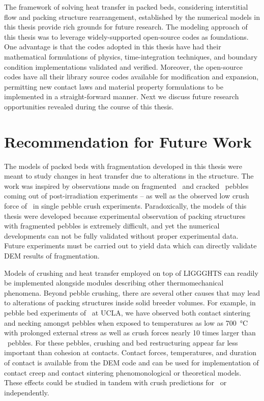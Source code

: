 The framework of solving heat transfer in packed beds, considering interstitial flow and packing structure rearrangement, established by the numerical models in this thesis provide rich grounds for future research. The modeling approach of this thesis was to leverage widely-supported open-source codes as foundations. One advantage is that the codes adopted in this thesis have had their mathematical formulations of physics, time-integration techniques, and boundary condition implementations validated and verified. Moreover, the open-source codes have all their library source codes available for modification and expansion, permitting new contact laws and material property formulations to be implemented in a straight-forward manner. Next we discuss future research opportunities revealed during the course of this thesis.

\section{Recommendation for Future Work}

The models of packed beds with fragmentation developed in this thesis were meant to study changes in heat transfer due to alterations in the structure. The work was inspired by observations made on fragmented \lis~and cracked \lit~pebbles coming out of post-irradiation experiments -- as well as the observed low crush force of \lis~in single pebble crush experiments. Paradoxically, the models of this thesis were developed because experimental observation of packing structures with fragmented pebbles is extremely difficult, and yet the numerical developments can not be fully validated without proper experimental data. Future experiments must be carried out to yield data which can directly validate DEM results of fragmentation.

Models of crushing and heat transfer employed on top of LIGGGHTS can readily be implemented alongside modules describing other thermomechanical phenomena. Beyond pebble crushing, there are several other causes that may lead to alterations of packing structures inside solid breeder volumes. For example, in pebble bed experiments of \lit~at UCLA, we have observed both contact sintering and necking amongst pebbles when exposed to temperatures as low as \SI{700}{\celsius} with prolonged external stress as well as crush forces nearly 10 times larger than \lis~pebbles. For these pebbles, crushing and bed restructuring appear far less important than cohesion at contacts. Contact forces, temperatures, and duration of contact is available from the DEM code and can be used for implementation of contact creep and contact sintering phenomonological or theoretical models. These effects could be studied in tandem with crush predictions for \lit~or independently.

